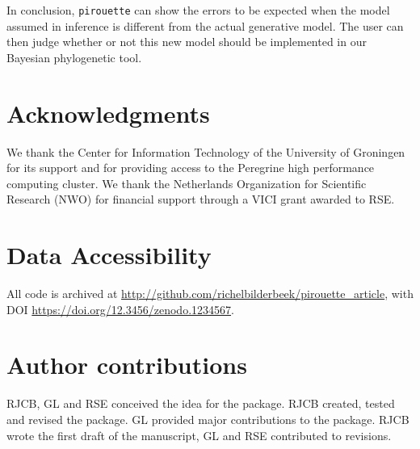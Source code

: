 In conclusion, \verb;pirouette; can show the errors to be expected
when the model assumed in inference is different from the 
actual generative model.
The user can then judge whether or not this new model should be implemented in our Bayesian phylogenetic tool. 

\section{Acknowledgments}

We thank the Center for Information Technology of the University 
of Groningen for its support and for providing access to the Peregrine 
high performance computing cluster. 
We thank the Netherlands 
Organization for Scientific Research (NWO) for financial support 
through a VICI grant awarded to RSE.

\section{Data Accessibility}

All code is archived at 
\url{http://github.com/richelbilderbeek/pirouette_article},
with DOI \url{https://doi.org/12.3456/zenodo.1234567}.

\section{Author contributions}

RJCB, GL and RSE conceived the idea for the package. 
RJCB created, tested and revised the package.
GL provided major contributions to the package.
RJCB wrote the first draft of the manuscript, 
GL and RSE contributed to revisions.





